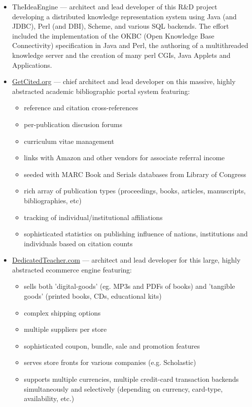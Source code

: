 \documentclass[line,margin,hidelinks]{res}
\begin{document}
\begin{resume}
\begin{position}
\begin{itemize}

\item TheIdeaEngine --- architect and lead developer of this R\&D project
  developing a distributed knowledge representation system using
  Java (and JDBC), Perl (and DBI), Scheme, and various SQL backends.
  The effort included the
  implementation of the OKBC (Open Knowledge Base Connectivity)
  specification in Java and Perl,
  the authoring of a multithreaded knowledge server
  and the creation of many perl CGIs, Java Applets and Applications.

\item \href{https://web.archive.org/web/20140517102110/http://getcited.org/}{GetCited.org}
  --- chief architect and lead developer on this massive, highly abstracted
      academic bibliographic portal system featuring:
  \begin{itemize}
    \item reference and citation cross-references
    \item per-publication discusion forums
    \item curriculum vitae management
    \item links with Amazon and other vendors for associate
    referral income
    \item seeded with MARC Book and Serials databases from Library of Congress
    \item rich array of publication types (proceedings, books, articles,
       manuscripts, bibliographies, etc)
    \item tracking of individual/institutional affiliations
    \item sophisticated statistics on publishing influence of
       nations, institutions and individuals based on citation counts
  \end{itemize}

\item \href{https://web.archive.org/web/20130302232056/http://www.dedicatedteacher.com/}{DedicatedTeacher.com}
   --- architect and lead developer
  for this large, highly abstracted ecommerce engine featuring:
    \begin{itemize}
      \item sells both 'digital-goods' (eg. MP3s and PDFs of books)
      and 'tangible goods' (printed books, CDs, educational kits)
      \item complex shipping options
      \item multiple suppliers per store
      \item sophisticated coupon, bundle, sale and promotion features
      \item serves store fronts for various companies
      (e.g. Scholastic)
      \item supports multiple currencies, multiple credit-card
      transaction backends simultaneously and selectively
      (depending on currency, card-type, availability, etc.)
    \end{itemize}


\end{itemize}
\end{position}
\end{resume}
\end{document}

